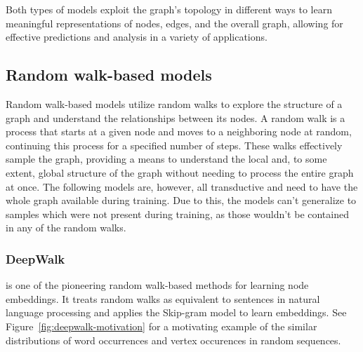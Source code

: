 Both types of models exploit the graph's topology in different ways to learn meaningful representations of nodes, edges, and the overall graph, allowing for effective predictions and analysis in a variety of applications.

\subsection{Random walk-based models}

Random walk-based models utilize random walks to explore the structure of a graph and understand the relationships between its nodes. A random walk is a process that starts at a given node and moves to a neighboring node at random, continuing this process for a specified number of steps. These walks effectively sample the graph, providing a means to understand the local and, to some extent, global structure of the graph without needing to process the entire graph at once. The following models are, however, all transductive and need to have the whole graph available during training. Due to this, the models can't generalize to samples which were not present during training, as those wouldn't be contained in any of the random walks.

\subsubsection{DeepWalk}

 is one of the pioneering random walk-based methods for learning node embeddings. It treats random walks as equivalent to sentences in natural language processing and applies the Skip-gram model to learn embeddings. See Figure~\ref{fig:deepwalk-motivation} for a motivating example of the similar distributions of word occurrences and vertex occurences in random sequences.

